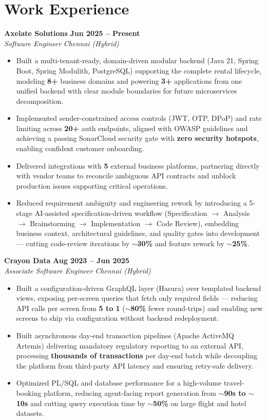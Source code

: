 \documentclass[a4paper,10pt]{article}
\newcommand{\jobentry}[4]{%
  \vspace{6pt}
  \noindent\textbf{#1} \hfill \textbf{#4}\\[2pt]
  \textit{#2} \hfill \textit{#3}\par
}
\begin{document}
\section*{Work Experience}
\jobentry{Axelate Solutions}{Software Engineer}{Chennai (Hybrid)}{Jun 2025 -- Present}
\begin{itemize}
    \item Built a multi-tenant-ready, domain-driven modular backend (Java 21, Spring Boot, Spring Modulith, PostgreSQL) supporting the complete rental lifecycle, modeling \textbf{8+} business domains and powering \textbf{3+} applications from one unified backend with clear module boundaries for future microservices decomposition.
    \item Implemented sender-constrained access controls (JWT, OTP, DPoP) and rate limiting across \textbf{20+} auth endpoints, aligned with OWASP guidelines and achieving a passing SonarCloud security gate with \textbf{zero security hotspots}, enabling confident customer onboarding.
    \item Delivered integrations with \textbf{5} external business platforms, partnering directly with vendor teams to reconcile ambiguous API contracts and unblock production issues supporting critical operations.
    \item Reduced requirement ambiguity and engineering rework by introducing a 5-stage AI-assisted specification-driven workflow (Specification $\to$ Analysis $\to$ Brainstorming $\to$ Implementation $\to$ Code Review), embedding business context, architectural guidelines, and quality gates into development --- cutting code-review iterations by \textbf{$\sim$30\%} and feature rework by \textbf{$\sim$25\%}.
\end{itemize}
\jobentry{Crayon Data}{Associate Software Engineer}{Chennai (Hybrid)}{Aug 2023 -- Jun 2025}
\begin{itemize}
    \item Built a configuration-driven GraphQL layer (Hasura) over templated backend views, exposing per-screen queries that fetch only required fields --- reducing API calls per screen from \textbf{5 to 1} (\textbf{$\sim$80\%} fewer round-trips) and enabling new screens to ship via configuration without backend redeployment.
    \item Built asynchronous day-end transaction pipelines (Apache ActiveMQ Artemis) delivering mandatory regulatory reporting to an external API, processing \textbf{thousands of transactions} per day-end batch while decoupling the platform from third-party API latency and ensuring retry-safe delivery.
    \item Optimized PL/SQL and database performance for a high-volume travel-booking platform, reducing agent-facing report generation from \textbf{$\sim$90s to $\sim$10s} and cutting query execution time by \textbf{$\sim$50\%} on large flight and hotel datasets.
\end{itemize}
\end{document}
